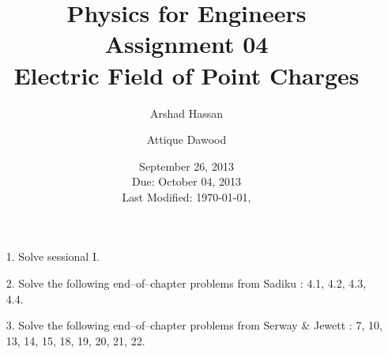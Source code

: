 \documentclass[12pt,a4paper]{article}
\title{\vspace{-3cm}Physics for Engineers\\Assignment 04\\Electric Field of Point Charges}
\author{Arshad Hassan\and Attique Dawood}
\date{September 26, 2013\\Due: October 04, 2013\\[0.2cm] Last Modified: \today, \currenttime}
\begin{document}
\maketitle
\begin{itemize}
\item[1.] Solve sessional I.
\item[2.] Solve the following end--of--chapter problems from Sadiku \cite[Ch. 4, pg. 155]{Sadiku}: 4.1, 4.2, 4.3, 4.4.
\item[3.] Solve the following end--of--chapter problems from Serway \& Jewett \cite[Ch. 23, pg. 730--732]{Serway}: 7, 10, 13, 14, 15, 18, 19, 20, 21, 22.
\end{itemize}


\end{document}
